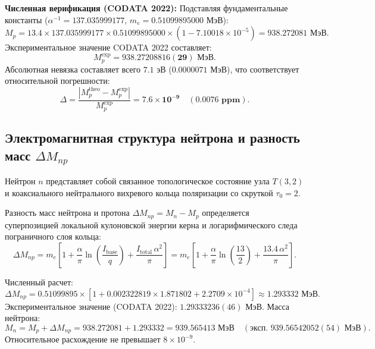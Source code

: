 \documentclass[12pt,a4paper]{article}
\theoremstyle{definition}
\theoremstyle{remark}
\begin{document}
\textbf{Численная верификация (CODATA 2022):}
Подставляя фундаментальные константы ($\alpha^{-1} = 137.035999177$, $m_e = 0.51099895000$ МэВ):
\begin{equation}
	M_p = 13.4 \times 137.035999177 \times 0.51099895000 \times \left( 1 - 7.10018 \times 10^{-5} \right) = \mathbf{938.272081 \text{ МэВ}}.
	\label{eq:mp_calc_value}
\end{equation}
Экспериментальное значение CODATA 2022 составляет:
\begin{equation}
	M_p^{\mathrm{exp}} = \mathbf{938.27208816(29) \text{ МэВ}}.
\end{equation}
Абсолютная невязка составляет всего $\mathbf{7.1 \text{ эВ}}$ ($0.0000071$ МэВ), что соответствует относительной погрешности:
\begin{equation}
	\Delta = \frac{|M_p^{\mathrm{theo}} - M_p^{\mathrm{exp}}|}{M_p^{\mathrm{exp}}} = \mathbf{7.6 \times 10^{-9}} \quad (\mathbf{0.0076 \text{ ppm}}).
	\label{eq:proton_ppm_accuracy}
\end{equation}

\subsection{Электромагнитная структура нейтрона и разность масс $\Delta M_{np}$}
Нейтрон $n$ представляет собой связанное топологическое состояние узла $T(3,2)$ и коаксиального нейтрального вихревого кольца поляризации со скруткой $\tau_0 = 2$.

Разность масс нейтрона и протона $\Delta M_{np} = M_n - M_p$ определяется суперпозицией локальной кулоновской энергии керна и логарифмического следа пограничного слоя кольца:
\begin{equation}
	\Delta M_{np} = m_e \left[ 1 + \frac{\alpha}{\pi} \ln\left(\frac{I_{\mathrm{base}}}{q}\right) + \frac{I_{\mathrm{total}} \, \alpha^2}{\pi} \right] = m_e \left[ 1 + \frac{\alpha}{\pi} \ln\left(\frac{13}{2}\right) + \frac{13.4 \, \alpha^2}{\pi} \right].
	\label{eq:delta_mnp_formula}
\end{equation}

Численный расчет:
\begin{equation}
	\Delta M_{np} = 0.51099895 \times \left[ 1 + 0.002322819 \times 1.871802 + 2.2709 \times 10^{-4} \right] \approx \mathbf{1.293332 \text{ МэВ}}.
	\label{eq:delta_mnp_calc}
\end{equation}
Экспериментальное значение (CODATA 2022): $1.29333236(46)$ МэВ.
Масса нейтрона:
\begin{equation}
	M_n = M_p + \Delta M_{np} = 938.272081 + 1.293332 = \mathbf{939.565413 \text{ МэВ}} \quad (\text{эксп. } 939.56542052(54) \text{ МэВ}).
	\label{eq:mn_calc}
\end{equation}
Относительное расхождение не превышает $8 \times 10^{-9}$.
\end{document}
